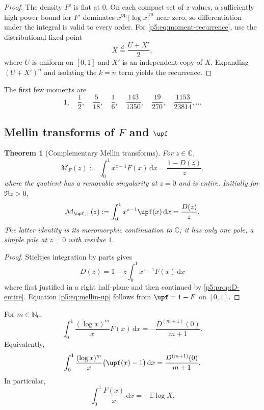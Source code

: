 \documentclass[11pt,oneside]{article}
\newtheorem{theorem}{Theorem}[section]
\theoremstyle{definition}
\theoremstyle{remark}
\newcommand{\E}{\mathbb E}
\newcommand{\C}{\mathbb C}
\newcommand{\N}{\mathbb N}
\newcommand{\dd}{\,\mathrm d}
\newcommand{\1}{\mathbf 1}
\begin{document}
\begin{proof}
The density $F'$ is flat at $0$.  On each compact set of $z$-values, a sufficiently high power bound for $F'$ dominates $x^{\Re z}|\log x|^m$ near zero, so differentiation under the integral is valid to every order.  For \eqref{p5:eq:moment-recurrence}, use the distributional fixed point
\[
 X\overset d=\frac{U+X'}2,
\]
where $U$ is uniform on $[0,1]$ and $X'$ is an independent copy of $X$.  Expanding $(U+X')^n$ and isolating the $k=n$ term yields the recurrence.
\end{proof}

The first few moments are
\begin{equation}\label{p5:eq:first-moments}
 1,\quad \frac12,\quad \frac5{18},\quad \frac16,
 \quad \frac{143}{1350},\quad \frac{19}{270},
 \quad \frac{1153}{23814},\ldots
\end{equation}

\subsection{Mellin transforms of $F$ and $\upf$}

\begin{theorem}[Complementary Mellin transforms]\label{p5:thm:mellin-pair}
For $z\in\C$,
\begin{equation}\label{p5:eq:mellin-F}
 \mathcal M_F(z):=\int_0^1x^{z-1}F(x)\dd x
 =\frac{1-D(z)}{z},
\end{equation}
where the quotient has a removable singularity at $z=0$ and is entire.  Initially for $\Re z>0$,
\begin{equation}\label{p5:eq:mellin-up}
 \mathcal M_{\upf,+}(z):=\int_0^1x^{z-1}\upf(x)\dd x
 =\frac{D(z)}{z}.
\end{equation}
The latter identity is its meromorphic continuation to $\C$; it has only one pole, a simple pole at $z=0$ with residue $1$.
\end{theorem}

\begin{proof}
Stieltjes integration by parts gives
\[
 D(z)=1-z\int_0^1x^{z-1}F(x)\dd x
\]
where first justified in a right half-plane and then continued by \cref{p5:prop:D-entire}.  Equation \eqref{p5:eq:mellin-up} follows from $\upf=1-F$ on $[0,1]$.
\end{proof}

\begin{corollary}\label{p5:cor:logarithmic-hierarchy}
For $m\in\N_0$,
\begin{equation}\label{p5:eq:logarithmic-F}
 \int_0^1\frac{(\log x)^m}{x}F(x)\dd x
 =-\frac{D^{(m+1)}(0)}{m+1}.
\end{equation}
Equivalently,
\begin{equation}\label{p5:eq:logarithmic-up-regularized}
 \int_0^1\frac{(\log x)^m}{x}\bigl(\upf(x)-1\bigr)\dd x
 =\frac{D^{(m+1)}(0)}{m+1}.
\end{equation}
In particular,
\begin{equation}\label{p5:eq:ElogX}
 \int_0^1\frac{F(x)}x\dd x=-\E\log X.
\end{equation}
\end{corollary}
\end{document}
